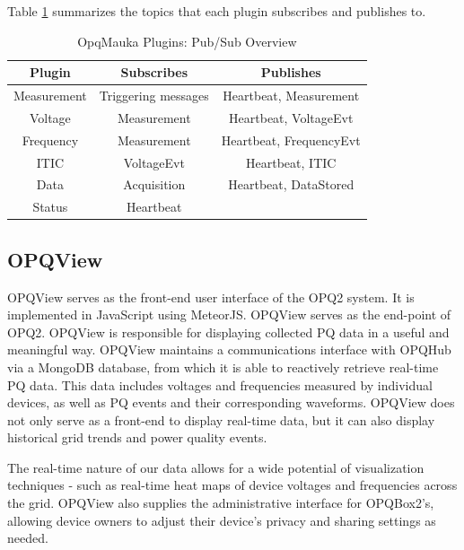 \documentclass[a4paper, conference]{IEEEtran}
\begin{document}
Table \ref{table:opqmauka} summarizes the topics that each plugin subscribes and publishes to.

\begin{table}
	\begin{tabular}{|c|c|c|}
		\hline 
		Plugin & Subscribes & Publishes \\ 
		\hline 
		Measurement  & Triggering messages & Heartbeat, Measurement \\ 
		\hline 
		Voltage & Measurement & Heartbeat, VoltageEvt \\ 
		\hline 
		Frequency  & Measurement & Heartbeat, FrequencyEvt \\ 
		\hline 
		ITIC &  VoltageEvt & Heartbeat, ITIC \\ 
		\hline 
		Data &  Acquisition & Heartbeat, DataStored \\ 
		\hline 
		Status & Heartbeat &  \\ 
		\hline 
	\end{tabular}
	\caption{OpqMauka Plugins: Pub/Sub Overview}
	\label{table:opqmauka}
\end{table}
 
\subsection{OPQView}
OPQView serves as the front-end user interface of the OPQ2 system. It is implemented in JavaScript using MeteorJS. OPQView serves as the end-point of OPQ2. OPQView is responsible for displaying collected PQ data in a useful and meaningful way. OPQView maintains a communications interface with OPQHub via a MongoDB database, from which it is able to reactively retrieve real-time PQ data. This data includes voltages and frequencies measured by individual devices, as well as PQ events and their corresponding waveforms.  OPQView does not only serve as a front-end to display real-time data, but it can also display historical grid trends and power quality events. 

The real-time nature of our data allows for a wide potential of visualization techniques - such as real-time heat maps of device voltages and frequencies across the grid. OPQView also supplies the administrative interface for OPQBox2's, allowing device owners to adjust their device's privacy and sharing settings as needed. 
\end{document}

